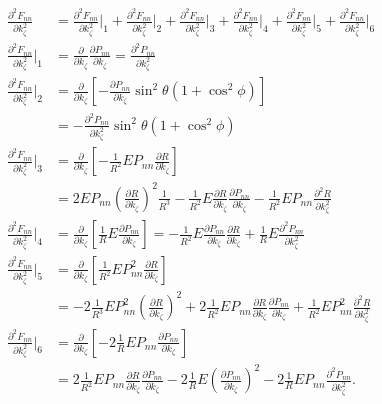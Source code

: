 \documentclass{article}
\begin{document}
\begin{align}
\frac{\partial^2 F_{nn}}{\partial k_{\zeta}^2} &= \frac{\partial^2 F_{nn}}{\partial k_{\zeta}^2}\bigg|_{1} + \frac{\partial^2 F_{nn}}{\partial k_{\zeta}^2}\bigg|_{2} + \frac{\partial^2 F_{nn}}{\partial k_{\zeta}^2}\bigg|_{3} + \frac{\partial^2 F_{nn}}{\partial k_{\zeta}^2}\bigg|_{4} + \frac{\partial^2 F_{nn}}{\partial k_{\zeta}^2}\bigg|_{5} + \frac{\partial^2 F_{nn}}{\partial k_{\zeta}^2}\bigg|_{6} \\
\frac{\partial^2 F_{nn}}{\partial k_{\zeta}^2}\bigg|_{1} &=\frac{\partial}{\partial k_{\zeta}} \frac{\partial P_{nn}}{\partial k_{\zeta}} = \frac{\partial^2 P_{nn}}{\partial k_{\zeta}^2} \\
\frac{\partial^2 F_{nn}}{\partial k_{\zeta}^2}\bigg|_{2} &= \frac{\partial}{\partial k_{\zeta}} \left[ - \frac{\partial P_{nn}}{\partial k_{\zeta}}  \sin^2{\theta} (1 + \cos^2{\phi}) \right] \\
&= - \frac{\partial^2 P_{nn}}{\partial k_{\zeta}^2} \sin^2{\theta} (1 + \cos^2{\phi}) \\
\frac{\partial^2 F_{nn}}{\partial k_{\zeta}^2}\bigg|_{3} &= \frac{\partial}{\partial k_{\zeta}} \left[-\frac{1}{R^2} E P_{nn} \frac{\partial R}{\partial k_{\zeta}} \right] \\
&= 2 E P_{nn} \left( \frac{\partial R}{\partial k_{\zeta}} \right)^2 \frac{1}{R^3} - \frac{1}{R^2} E \frac{\partial R}{\partial k_{\zeta}} \frac{\partial P_{nn}}{\partial k_{\zeta}} - \frac{1}{R^2} E P_{nn} \frac{\partial^2 R}{\partial k_{\zeta}^2} \\
\frac{\partial^2 F_{nn}}{\partial k_{\zeta}^2}\bigg|_{4} &= \frac{\partial}{\partial k_{\zeta}} \left[ \frac{1}{R} E \frac{\partial P_{nn}}{\partial k_{\zeta}} \right] = - \frac{1}{R^2} E \frac{\partial P_{nn}}{\partial k_{\zeta}} \frac{\partial R}{\partial k_{\zeta}} + \frac{1}{R} E \frac{\partial^2 P_{nn}}{\partial k_{\zeta}^2} \\
\frac{\partial^2 F_{nn}}{\partial k_{\zeta}^2}\bigg|_{5} &= \frac{\partial}{\partial k_{\zeta}} \left[ \frac{1}{R^2} E P_{nn}^2 \frac{\partial R}{\partial k_{\zeta}} \right] \\
&= -2 \frac{1}{R^3} E P_{nn}^2 \left(\frac{\partial R}{\partial k_{\zeta}}\right)^2 + 2 \frac{1}{R^2} E P_{nn} \frac{\partial R}{\partial k_{\zeta}} \frac{\partial P_{nn}}{\partial k_{\zeta}} + \frac{1}{R^2} E P_{nn}^2 \frac{\partial^2 R}{\partial k_{\zeta}^2} \\
\frac{\partial^2 F_{nn}}{\partial k_{\zeta}^2}\bigg|_{6} &= \frac{\partial}{\partial k_{\zeta}} \left[-2 \frac{1}{R} E P_{nn} \frac{\partial P_{nn}}{\partial k_{\zeta}} \right] \\
&= 2 \frac{1}{R^2} E P_{nn} \frac{\partial R}{\partial k_{\zeta}} \frac{\partial P_{nn}}{\partial k_{\zeta}} - 2 \frac{1}{R} E \left(\frac{\partial P_{nn}}{\partial k_{\zeta}} \right)^2 - 2 \frac{1}{R} E P_{nn} \frac{\partial^2 P_{nn}}{\partial k_{\zeta}^2}.
\end{align}
\end{document}
